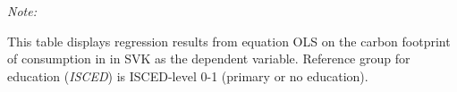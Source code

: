 \begin{table}[htbp!]
\begin{adjustbox}{width = 1\textwidth, max height = 0.95\textheight, center}
\begin{threeparttable}[b]
         \begin{tablenotes}\item \medskip \textit{Note:}
            \item This table displays regression results from equation OLS on the carbon footprint of consumption in  in SVK as the dependent variable.  Reference group for education (\textit{ISCED}) is ISCED-level 0-1 (primary or no education).
         \end{tablenotes}
      \end{threeparttable}
   \end{adjustbox}
\end{table}


